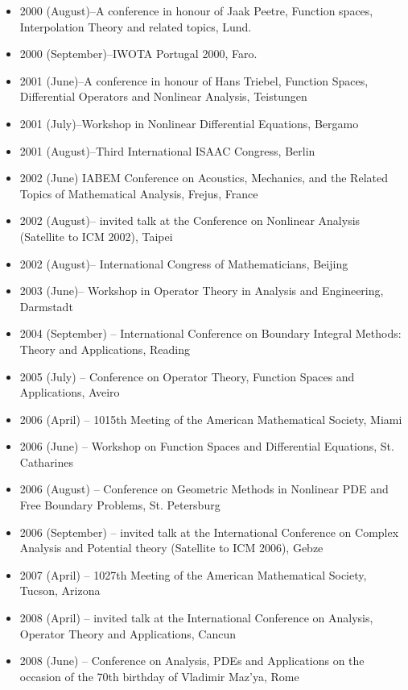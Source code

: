 \documentclass{article}
\begin{document}
\begin{itemize}
         \item 2000 (August)--A conference in honour of Jaak Peetre,
Function spaces, Interpolation Theory and related topics, Lund.
         \item 2000 (September)--IWOTA Portugal 2000, Faro.
         \item 2001 (June)--A conference in honour of Hans Triebel,
Function Spaces, Differential Operators and Nonlinear Analysis,
          Teistungen
         \item 2001 (July)--Workshop in Nonlinear Differential
Equations, Bergamo
         \item 2001 (August)--Third International ISAAC Congress, Berlin
        \item 2002 (June) IABEM Conference on  Acoustics, Mechanics, and the Related Topics of Mathematical Analysis, Frejus, France
         \item 2002 (August)-- invited talk at the Conference on
Nonlinear Analysis (Satellite to ICM 2002), Taipei
         \item 2002 (August)-- International Congress of
Mathematicians, Beijing
         \item 2003 (June)-- Workshop in Operator Theory in Analysis and
Engineering, Darmstadt
         \item 2004 (September) -- International Conference on Boundary Integral Methods: Theory and Applications, Reading
         \item 2005 (July) -- Conference on Operator Theory, Function Spaces and Applications, Aveiro
         \item 2006 (April) -- 1015th Meeting of the American Mathematical Society, Miami
         \item 2006 (June) -- Workshop on Function Spaces and Differential Equations, St. Catharines
         \item 2006 (August) -- Conference on Geometric Methods in Nonlinear PDE and Free Boundary Problems, St. Petersburg
         \item 2006 (September) -- invited talk at the International Conference on Complex Analysis and Potential theory (Satellite to ICM 2006), Gebze
         \item 2007 (April) -- 1027th Meeting of the American Mathematical Society, Tucson, Arizona
         \item 2008 (April) -- invited talk at the International Conference on Analysis, Operator Theory and Applications, Cancun
         \item 2008 (June) -- Conference on Analysis, PDEs and Applications on the occasion of the 70th birthday of Vladimir Maz'ya, Rome

\end{itemize}
\end{document}
